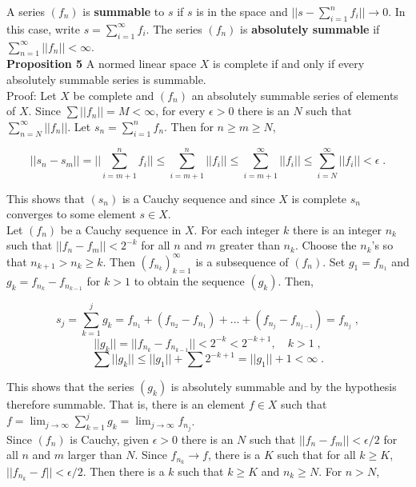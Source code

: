 \documentclass[a4paper]{article}
\begin{document}
A series $(f_n)$ is {\bf summable} to $s$ if $s$ is in the space and $||s - \sum_{i=1}^n f_i || \rightarrow 0$. In this case, write $s = \sum_{i=1}^\infty f_i$. The series $(f_n)$ is {\bf absolutely summable} if $\sum_{n=1}^\infty ||f_n|| < \infty$. \\

{\bf Proposition 5} A normed linear space $X$ is complete if and only if every absolutely summable series is summable. \\

Proof: Let $X$ be complete and $(f_n)$ an absolutely summable series of elements of $X$. Since $\sum ||f_n|| = M < \infty$, for every $\epsilon>0$ there is an $N$ such that $\sum_{n=N}^\infty ||f_n||$. Let $s_n = \sum_{i=1}^n f_n$. Then for $n\geq m \geq N$, 

$$||s_n - s_m|| = ||\sum_{i=m+1}^n f_i|| \leq \sum_{i=m+1}^n ||f_i|| \leq \sum_{i=m+1}^\infty ||f_i|| \leq \sum_{i=N}^\infty ||f_i|| < \epsilon \;.$$

This shows that $(s_n)$ is a Cauchy sequence and since $X$ is complete $s_n$ converges to some element $s \in X$. \\

Let $(f_n)$ be a Cauchy sequence in $X$. For each integer $k$ there is an integer $n_k$ such that $||f_n - f_m|| < 2^{-k}$ for all $n$ and $m$ greater than $n_k$. Choose the $n_k$'s so that $n_{k+1} > n_k\geq k$. Then $(f_{n_k})_{k=1}^\infty$ is a subsequence of $(f_n)$. Set $g_1 = f_{n_1}$ and $g_k = f_{n_k}- f_{n_{k-1}}$ for $k > 1$ to obtain the sequence $(g_k)$. Then,

$$s_j = \sum_{k=1}^j g_k = f_{n_1} + (f_{n_2} - f_{n_1}) + ... + (f_{n_j} - f_{n_{j-1}}) = f_{n_j} \;,$$
$$||g_k|| = ||f_{n_k} - f_{n_{k-1}}|| < 2^{-k} < 2^{-k+1}, \quad k > 1 \;,$$
$$\sum ||g_k|| \leq ||g_1|| + \sum 2^{-k+1} = ||g_1|| + 1 < \infty \;. $$

This shows that the series $(g_k)$ is absolutely summable and by the hypothesis therefore summable. That is, there is an element $f \in X$ such that $f = \lim_{j\rightarrow \infty} \sum_{k=1}^j g_k = \lim_{j\rightarrow \infty} f_{n_j}$. \\

Since $(f_n)$ is Cauchy, given $\epsilon > 0$ there is an $N$ such that $||f_n - f_m|| < \epsilon /2$ for all $n$ and $m$ larger than $N$. Since $f_{n_k} \rightarrow f$, there is a $K$ such that for all $k \geq K$, $||f_{n_k} - f|| < \epsilon / 2$. Then there is a $k$ such that $k \geq K$ and $n_k \geq N$. For $n > N$,
\end{document}
